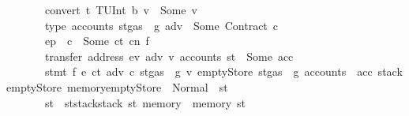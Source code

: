 \begin{isabellebody}
\ \ \ \ \ \ \ {\isachardoublequoteopen}convert\ t\ {\isacharparenleft}{\kern0pt}TUInt\ b{}{}{}{\isacharparenright}{\kern0pt}\ v\ {\isacharequal}{\kern0pt}\ Some\ v{\isacharprime}{\kern0pt}{\isachardoublequoteclose}\isanewline
\ \ \ \ \ \ \ {\isachardoublequoteopen}type\ {\isacharparenleft}{\kern0pt}accounts\ {\isacharparenleft}{\kern0pt}st{\isasymlparr}gas\ {\isacharcolon}{\kern0pt}{\isacharequal}{\kern0pt}\ g{\isasymrparr}{\isacharparenright}{\kern0pt}\ adv{\isacharparenright}{\kern0pt}\ {\isacharequal}{\kern0pt}\ Some\ {\isacharparenleft}{\kern0pt}Contract\ c{\isacharparenright}{\kern0pt}{\isachardoublequoteclose}\isanewline
\ \ \ \ \ \ \ {\isachardoublequoteopen}ep\ {\isachardollar}{\kern0pt}{\isachardollar}{\kern0pt}\ c\ {\isacharequal}{\kern0pt}\ Some\ {\isacharparenleft}{\kern0pt}ct{\isacharcomma}{\kern0pt}\ cn{\isacharcomma}{\kern0pt}\ f{\isacharparenright}{\kern0pt}{\isachardoublequoteclose}\isanewline
\ \ \ \ \ \ \ {\isachardoublequoteopen}transfer\ {\isacharparenleft}{\kern0pt}address\ ev{\isacharparenright}{\kern0pt}\ adv\ v{\isacharprime}{\kern0pt}\ {\isacharparenleft}{\kern0pt}accounts\ st{\isacharparenright}{\kern0pt}\ {\isacharequal}{\kern0pt}\ Some\ acc{\isachardoublequoteclose}\isanewline
\ \ \ \ \ \ \ {\isachardoublequoteopen}stmt\ f\ {\isacharparenleft}{\kern0pt}e{\isacharprime}{\kern0pt}\ ct\ adv\ c\ {\isacharparenleft}{\kern0pt}st{\isasymlparr}gas\ {\isacharcolon}{\kern0pt}{\isacharequal}{\kern0pt}\ g{\isacharprime}{\kern0pt}{\isasymrparr}{\isacharparenright}{\kern0pt}\ v{\isacharprime}{\kern0pt}{\isacharparenright}{\kern0pt}\ emptyStore\ {\isacharparenleft}{\kern0pt}st{\isasymlparr}gas\ {\isacharcolon}{\kern0pt}{\isacharequal}{\kern0pt}\ g{\isacharprime}{\kern0pt}{\isacharcomma}{\kern0pt}\ accounts\ {\isacharcolon}{\kern0pt}{\isacharequal}{\kern0pt}\ acc{\isacharcomma}{\kern0pt}\ stack{\isacharcolon}{\kern0pt}{\isacharequal}{\kern0pt}emptyStore{\isacharcomma}{\kern0pt}\ memory{\isacharcolon}{\kern0pt}{\isacharequal}{\kern0pt}emptyStore{\isasymrparr}{\isacharparenright}{\kern0pt}\ {\isacharequal}{\kern0pt}\ Normal\ {\isacharparenleft}{\kern0pt}{\isacharparenleft}{\kern0pt}{\isacharparenright}{\kern0pt}{\isacharcomma}{\kern0pt}\ st{\isacharprime}{\kern0pt}{\isacharprime}{\kern0pt}{\isacharparenright}{\kern0pt}{\isachardoublequoteclose}\isanewline
\ \ \ \ \ \ \ {\isachardoublequoteopen}st{\isacharprime}{\kern0pt}\ {\isacharequal}{\kern0pt}\ st{\isacharprime}{\kern0pt}{\isacharprime}{\kern0pt}{\isasymlparr}stack{\isacharcolon}{\kern0pt}{\isacharequal}{\kern0pt}stack\ st{\isacharcomma}{\kern0pt}\ memory\ {\isacharcolon}{\kern0pt}{\isacharequal}{\kern0pt}\ memory\ st{\isasymrparr}{\isachardoublequoteclose}\isanewline

\end{isabellebody}
